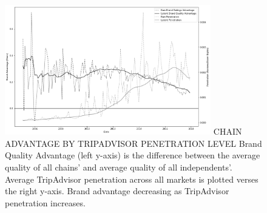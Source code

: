         
     
         
        

\begin{figure}[htp]
\FIGURE
{\includegraphics[width=0.8\textwidth,height=\textheight,keepaspectratio]{./Figures/OTA_Brand_v_Chain_v_PenetrationV2.png}}
{CHAIN ADVANTAGE BY TRIPADVISOR PENETRATION LEVEL\label{fig:modelfree}}
{Brand Quality Advantage (left y-axis) is the difference between the average quality of all chains' and average quality of all independents'. Average TripAdvisor penetration across all markets is plotted verses the right y-axis. Brand advantage decreasing as TripAdvisor penetration increases.}
\end{figure}
\clearpage


